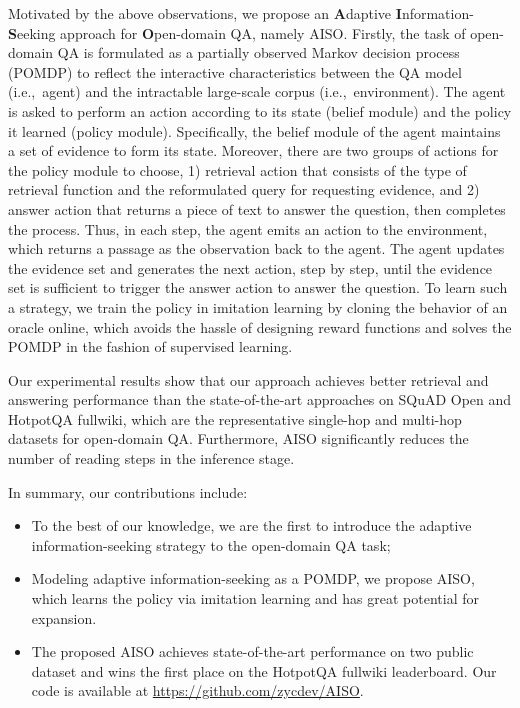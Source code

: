 \documentclass[11pt]{article}
\begin{document}
Motivated by the above observations, we propose an \textbf{A}daptive \textbf{I}nformation-\textbf{S}eeking approach for \textbf{O}pen-domain QA, namely AISO. 
Firstly, the task of open-domain QA is formulated as a partially observed Markov decision process (POMDP) to reflect the interactive characteristics between the QA model (i.e.,~agent) and the intractable large-scale corpus (i.e.,~environment).
The agent is asked to perform an action according to its state (belief module) and the policy it learned (policy module).
Specifically, the belief module of the agent maintains a set of evidence to form its state.
Moreover, there are two groups of actions for the policy module to choose, 
1) retrieval action that consists of the type of retrieval function and the reformulated query for requesting evidence, 
and 2) answer action that returns a piece of text to answer the question, then completes the process.
Thus, in each step, the agent emits an action to the environment, which returns a passage as the observation back to the agent. 
The agent updates the evidence set and generates the next action, step by step, until the evidence set is sufficient to trigger the answer action to answer the question.
To learn such a strategy, we train the policy in imitation learning by cloning the behavior of an oracle online, which avoids the hassle of designing reward functions and solves the POMDP in the fashion of supervised learning.

Our experimental results show that our approach achieves better retrieval and answering performance than the state-of-the-art approaches on SQuAD Open and HotpotQA fullwiki, which are the representative single-hop and multi-hop datasets for open-domain QA. 
Furthermore, AISO significantly reduces the number of reading steps in the inference stage.


In summary, our contributions include: 
\begin{itemize}
    \item To the best of our knowledge, we are the first to introduce the adaptive information-seeking strategy to the open-domain QA task;
    \item Modeling adaptive information-seeking as a POMDP, we propose AISO, which learns the policy via imitation learning and has great potential for expansion.
    \item The proposed AISO achieves state-of-the-art performance on two public dataset and wins the first place on the HotpotQA fullwiki leaderboard. Our code is available at \url{https://github.com/zycdev/AISO}.
\end{itemize}
\end{document}
